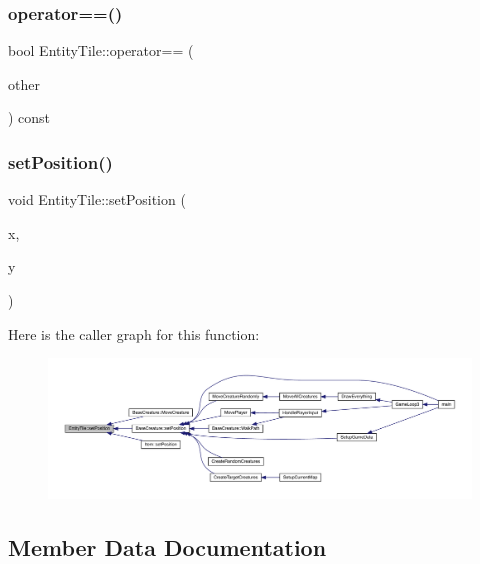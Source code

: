 \subsubsection{\texorpdfstring{operator==()}{operator==()}}
{\footnotesize\ttfamily bool Entity\+Tile\+::operator== (\begin{DoxyParamCaption}\item[{const \mbox{\hyperlink{class_entity_tile}{Entity\+Tile}} \&}]{other }\end{DoxyParamCaption}) const}

\mbox{\label{class_entity_tile_a7b9e5be8dc4017eb5af8e4fda7add3c4}} 
\subsubsection{\texorpdfstring{set\+Position()}{setPosition()}}
{\footnotesize\ttfamily void Entity\+Tile\+::set\+Position (\begin{DoxyParamCaption}\item[{int}]{x,  }\item[{int}]{y }\end{DoxyParamCaption})}

Here is the caller graph for this function\+:
\nopagebreak
\begin{figure}[H]
\begin{center}
\leavevmode
\includegraphics[width=350pt]{class_entity_tile_a7b9e5be8dc4017eb5af8e4fda7add3c4_icgraph}
\end{center}
\end{figure}


\subsection{Member Data Documentation}
\mbox{\label{class_entity_tile_a12416c687d821f5c9d8272b94c5764d4}} 
